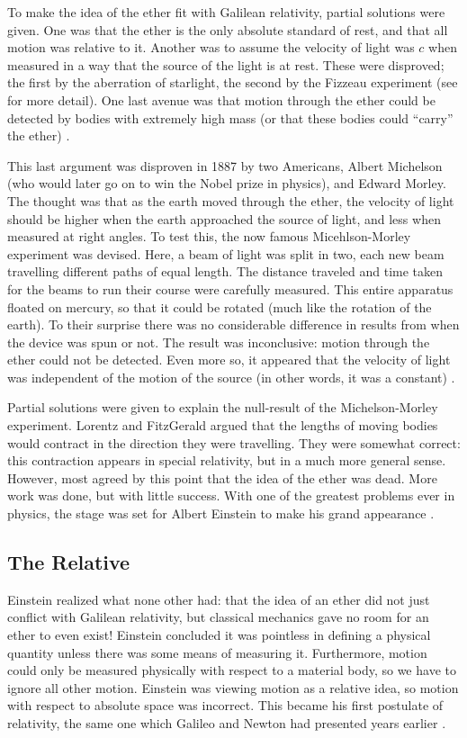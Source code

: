 \documentclass[12pt]{article}
\theoremstyle{defn}
\theoremstyle{pf}
\newcommand{\0}{\emptyset}
\renewcommand{\-}{\setminus}
\begin{document}
To make the idea of the ether fit with Galilean relativity, partial solutions were given. One was that the ether is the only absolute standard of rest, and that all motion was relative to it. Another was to assume the velocity of light was $c$ when measured in a way that the source of the light is at rest. These were disproved; the first by the aberration of starlight, the second by the Fizzeau experiment (see \cite{jackson} for more detail). One last avenue was that motion through the ether could be detected by bodies with extremely high mass (or that these bodies could ``carry'' the ether) \cite{jackson}.

This last argument was disproven in 1887 by two Americans, Albert Michelson (who would later go on to win the Nobel prize in physics), and Edward Morley. The thought was that as the earth moved through the ether, the velocity of light should be higher when the earth approached the source of light, and less when measured at right angles. To test this, the now famous Micehlson-Morley experiment was devised. Here, a beam of light was split in two, each new beam travelling different paths of equal length. The distance traveled and time taken for the beams to run their course were carefully measured. This entire apparatus floated on mercury, so that it could be rotated (much like the rotation of the earth). To their surprise there was no considerable difference in results from when the device was spun or not. The result was inconclusive: motion through the ether could not be detected. Even more so, it appeared that the velocity of light was independent of the motion of the source (in other words, it was a constant) \cite{taylor_wheeler}.

Partial solutions were given to explain the null-result of the Michelson-Morley experiment. Lorentz and FitzGerald argued that the lengths of moving bodies would contract in the direction they were travelling. They were somewhat correct: this contraction appears in special relativity, but in a much more general sense. However, most agreed by this point that the idea of the ether was dead. More work was done, but with little success. With one of the greatest problems ever in physics, the stage was set for Albert Einstein to make his grand appearance \cite{jackson}.

\subsection{The Relative}

Einstein realized what none other had: that the idea of an ether did not just conflict with Galilean relativity, but classical mechanics gave no room for an ether to even exist! Einstein concluded it was pointless in defining a physical quantity unless there was some means of measuring it. Furthermore, motion could only be measured physically with respect to a material body, so we have to ignore all other motion. Einstein was viewing motion as a relative idea, so motion with respect to absolute space was incorrect. This became his first postulate of relativity, the same one which Galileo and Newton had presented years earlier \cite{vanname_flory}. 
\end{document}
